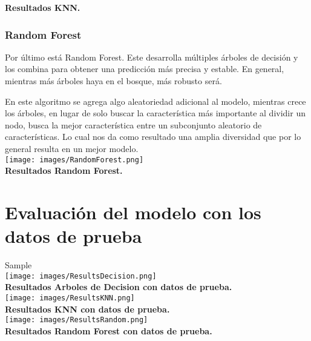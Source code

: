 \documentclass{article}
\begin{document}
            \textbf{Resultados KNN.} \\

        \subsubsection{Random Forest}

            Por último está Random Forest. Este desarrolla múltiples árboles de decisión y los combina para obtener una predicción más precisa y estable. En general, mientras más árboles haya en el bosque, más robusto será.

            En este algoritmo se agrega algo aleatoriedad adicional al modelo, mientras crece los árboles, en lugar de solo buscar la característica más importante al dividir un nodo, busca la mejor característica entre un subconjunto aleatorio de características. Lo cual nos da como resultado una amplia diversidad que por lo general resulta en un mejor modelo. \\

            \texttt{[image: images/RandomForest.png]} \\
    
            \textbf{Resultados Random Forest.} \\

\section{Evaluación del modelo con los datos de prueba}

    Sample \\

    \texttt{[image: images/ResultsDecision.png]} \\
    
    \textbf{Resultados Arboles de Decision con datos de prueba.} \\

    \texttt{[image: images/ResultsKNN.png]} \\
    
    \textbf{Resultados KNN con datos de prueba.} \\

    \texttt{[image: images/ResultsRandom.png]} \\
    
    \textbf{Resultados Random Forest con datos de prueba.} \\
\end{document}
